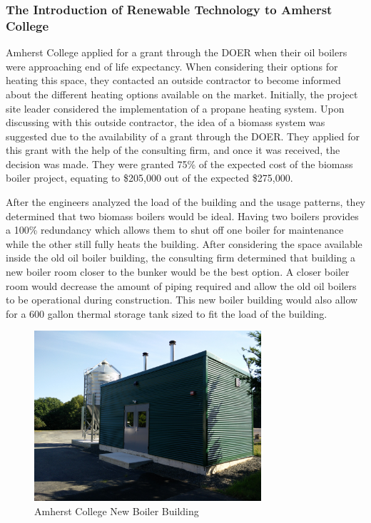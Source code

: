 \subsubsection{The Introduction of Renewable Technology to Amherst College}
\par Amherst College applied for a grant through the DOER when their oil boilers were approaching end of life expectancy. When considering their options for heating this space, they contacted an outside contractor to become informed about the different heating options available on the market. Initially, the project site leader considered the implementation of a propane heating system. Upon discussing with this outside contractor, the idea of a biomass system was suggested due to the availability of a grant through the DOER. They applied for this grant with the help of the consulting firm, and once it was received, the decision was made. They were granted 75\% of the expected cost of the biomass boiler project, equating to \$205,000 out of the expected \$275,000.
\par After the engineers analyzed the load of the building and the usage patterns, they determined that two biomass boilers would be ideal. Having two boilers provides a 100\% redundancy which allows them to shut off one boiler for maintenance while the other still fully heats the building. After considering the space available inside the old oil boiler building, the consulting firm determined that building a new boiler room closer to the bunker would be the best option. A closer boiler room would decrease the amount of piping required and allow the old oil boilers to be operational during construction. This new boiler building would also allow for a 600 gallon thermal storage tank sized to fit the load of the building.
\begin{figure}[H]
\centering
\includegraphics[width=0.75\textwidth]{findingschapter/amherstboilerroom}
\caption{Amherst College New Boiler Building}
\end{figure}

